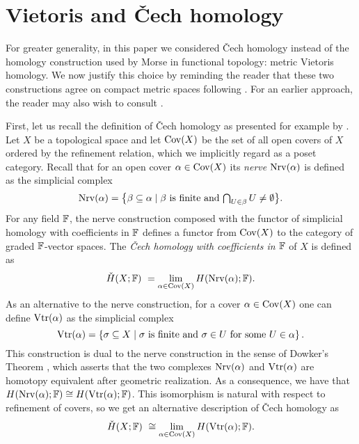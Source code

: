 
\section{Vietoris and \texorpdfstring{\v{C}}{}ech homology} \label{s:vietoris}

For greater generality, in this paper we considered \v{C}ech homology instead of the homology construction used by Morse in functional topology: metric Vietoris homology.
We now justify this choice by reminding the reader that these two constructions agree on compact metric spaces following \cite{Dowker.1952}.
For an earlier approach, the reader may also wish to consult \cite[Section VII.6]{Lefschetz.1942}.

First, let us recall the definition of \v{C}ech homology as presented for example by \cite[Section~IX--X]{Eilenberg.1952}.
Let $X$ be a topological space and let $\operatorname{Cov}(X)$ be the set of all open covers of $X$ ordered by the refinement relation, which we implicitly regard as a poset category.
Recall that for an open cover $\alpha \in \operatorname{Cov}(X)$ its \emph{nerve} $\operatorname{Nrv}(\alpha)$ is defined as the simplicial complex
\begin{equation*}
\operatorname{Nrv}(\alpha) =
\big\{ \beta \subseteq \alpha \mid \beta \text{ is finite and } \textstyle{\bigcap_{U \in \beta}} \, U \neq \emptyset \big\}.
\end{equation*}
For any field $\mathbb{F}$, the nerve construction composed with the functor of simplicial homology with coefficients in $\mathbb{F}$ defines a functor from $\operatorname{Cov}(X)$ to the category of graded $\mathbb{F}$-vector spaces.
The \emph{\v{C}ech homology with coefficients in $\mathbb{F}$} of $X$ is defined as
\begin{equation*}
\check{H}(X; \mathbb{F}) \ =
\lim_{\alpha \in \operatorname{Cov}(X)} H(\operatorname{Nrv}(\alpha); \mathbb{F}).
\end{equation*}
As an alternative to the nerve construction, for a cover $\alpha \in \operatorname{Cov}(X)$ one can define $\operatorname{Vtr}(\alpha)$ as the simplicial complex
\begin{equation*}
\operatorname{Vtr} (\alpha) = \left\{ \sigma \subseteq X \mid \sigma \text{ is finite and } \sigma \in U \text{ for some } U \in \alpha \right\}.
\end{equation*}
This construction is dual to the nerve construction in the sense of Dowker's Theorem \cite{Dowker.1952}, which asserts that the two complexes $\operatorname{Nrv} (\alpha)$ and $\operatorname{Vtr} (\alpha)$ are homotopy equivalent after geometric realization.
As a consequence, we have that $H (\operatorname{Nrv} (\alpha); \mathbb{F}) \cong H (\operatorname{Vtr} (\alpha); \mathbb{F})$.
This isomorphism is natural with respect to refinement of covers, so we get an alternative description of \v{C}ech homology as
\begin{equation*}
\check{H} (X; \mathbb{F}) \ \cong
\lim_{\alpha \in \operatorname{Cov} (X)} H (\operatorname{Vtr} (\alpha); \mathbb{F}).
\end{equation*}

